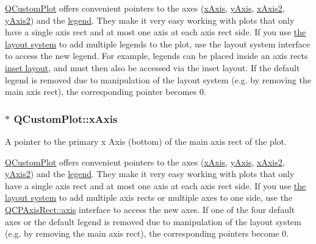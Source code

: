 \hyperlink{classQCustomPlot}{Q\+Custom\+Plot} offers convenient pointers to the axes (\hyperlink{classQCustomPlot_a9a79cd0158a4c7f30cbc702f0fd800e4}{x\+Axis}, \hyperlink{classQCustomPlot_af6fea5679725b152c14facd920b19367}{y\+Axis}, \hyperlink{classQCustomPlot_ada41599f22cad901c030f3dcbdd82fd9}{x\+Axis2}, \hyperlink{classQCustomPlot_af13fdc5bce7d0fabd640f13ba805c0b7}{y\+Axis2}) and the \hyperlink{classQCustomPlot_a4eadcd237dc6a09938b68b16877fa6af}{legend}. They make it very easy working with plots that only have a single axis rect and at most one axis at each axis rect side. If you use \hyperlink{}{the layout system} to add multiple legends to the plot, use the layout system interface to access the new legend. For example, legends can be placed inside an axis rect\textquotesingle{}s \hyperlink{classQCPAxisRect_a4114887c7141b59650b7488f930993e5}{inset layout}, and must then also be accessed via the inset layout. If the default legend is removed due to manipulation of the layout system (e.\+g. by removing the main axis rect), the corresponding pointer becomes 0. 
\subsubsection[{\texorpdfstring{x\+Axis}{xAxis}}]{ $\ast$ Q\+Custom\+Plot\+::x\+Axis}\hypertarget{classQCustomPlot_a9a79cd0158a4c7f30cbc702f0fd800e4}{}\label{classQCustomPlot_a9a79cd0158a4c7f30cbc702f0fd800e4}
A pointer to the primary x Axis (bottom) of the main axis rect of the plot.

\hyperlink{classQCustomPlot}{Q\+Custom\+Plot} offers convenient pointers to the axes (\hyperlink{classQCustomPlot_a9a79cd0158a4c7f30cbc702f0fd800e4}{x\+Axis}, \hyperlink{classQCustomPlot_af6fea5679725b152c14facd920b19367}{y\+Axis}, \hyperlink{classQCustomPlot_ada41599f22cad901c030f3dcbdd82fd9}{x\+Axis2}, \hyperlink{classQCustomPlot_af13fdc5bce7d0fabd640f13ba805c0b7}{y\+Axis2}) and the \hyperlink{classQCustomPlot_a4eadcd237dc6a09938b68b16877fa6af}{legend}. They make it very easy working with plots that only have a single axis rect and at most one axis at each axis rect side. If you use \hyperlink{}{the layout system} to add multiple axis rects or multiple axes to one side, use the \hyperlink{classQCPAxisRect_a560de44e47a4af0f86c59102a094b1e4}{Q\+C\+P\+Axis\+Rect\+::axis} interface to access the new axes. If one of the four default axes or the default legend is removed due to manipulation of the layout system (e.\+g. by removing the main axis rect), the corresponding pointers become 0. 
